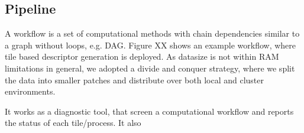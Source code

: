 \subsection{Pipeline}
\label{Pipe}
A workflow is a set of computational methods with chain dependencies similar to a graph without loops, e.g. DAG. Figure XX shows an example workflow, where tile based descriptor generation is deployed. As datasize is not within RAM limitations in general, we adopted a divide and conquer strategy, where we split the data into smaller patches and distribute over both local and cluster environments. 

It works as a diagnostic tool, that screen a computational workflow and reports the status of each tile/process. It also 



